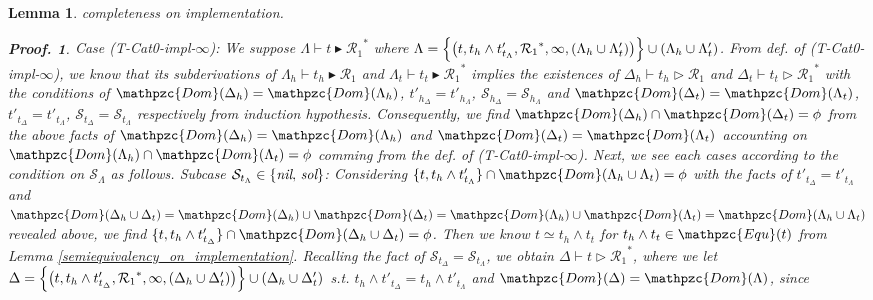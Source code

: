 \documentclass[12pt]{article}
\newtheorem{Lemma}{Lemma}[section]
\newtheorem{Proof}{Proof.}
\begin{document}
\begin{Lemma}{completeness on implementation.}
\begin{Proof}
    Case (T-Cat0-impl-$\infty$): We suppose
    $\Lambda \vdash t \blacktriangleright {\mathcal{R}_1}^*$ where
    $\Lambda = \Bigl\{\bigl(t, t_h \wedge t'_{t_\Lambda},
    {\mathcal{R}_1}^*, \infty, (\Lambda_h \cup \Lambda'_t) \bigr) \Bigr\}
    \cup (\Lambda_h \cup \Lambda'_t)$. From def. of (T-Cat0-impl-$\infty$),
    we know that its subderivations of
    $\Lambda_h \vdash t_h \blacktriangleright \mathcal{R}_1$ and
    $\Lambda_t \vdash t_t \blacktriangleright {\mathcal{R}_1}^*$ implies
    the existences of $\Delta_h \vdash t_h \triangleright \mathcal{R}_1$
    and $\Delta_t \vdash t_t \triangleright {\mathcal{R}_1}^*$ with
    the conditions of
    $\mathpzc{Dom}(\Delta_h) = \mathpzc{Dom}(\Lambda_h)$,
    $t'_{h_\Delta} = t'_{h_\Lambda}$,
    $\mathcal{S}_{h_\Delta} = \mathcal{S}_{h_\Lambda}$ and
    $\mathpzc{Dom}(\Delta_t) = \mathpzc{Dom}(\Lambda_t)$,
    $t'_{t_\Delta} = t'_{t_\Lambda}$,
    $\mathcal{S}_{t_\Delta} = \mathcal{S}_{t_\Lambda}$ respectively
    from induction hypothesis. Consequently, we find
    $\mathpzc{Dom}(\Delta_h) \cap \mathpzc{Dom}(\Delta_t) = \phi$ from
    the above facts of $\mathpzc{Dom}(\Delta_h) = \mathpzc{Dom}(\Lambda_h)$
    and $\mathpzc{Dom}(\Delta_t) = \mathpzc{Dom}(\Lambda_t)$ accounting on
    $\mathpzc{Dom}(\Lambda_h) \cap \mathpzc{Dom}(\Lambda_t) = \phi$ comming
    from the def. of (T-Cat0-impl-$\infty$). Next, we see each cases
    according to the condition on $\mathcal{S}_\Lambda$ as follows.
    Subcase
    $\mathcal{S}_{t_\Lambda} \in \{\text{\it nil},\, \text{\it sol} \}$:
    Considering
    $\{t, t_h \wedge t'_{t_\Lambda} \} \cap \mathpzc{Dom}(\Lambda_h
    \cup \Lambda_t) = \phi$ with the facts of
    $t'_{t_\Delta} = t'_{t_\Lambda}$ and
    $\mathpzc{Dom}(\Delta_h \cup \Delta_t) =
    \mathpzc{Dom}(\Delta_h) \cup \mathpzc{Dom}(\Delta_t) =
    \mathpzc{Dom}(\Lambda_h) \cup \mathpzc{Dom}(\Lambda_t) =
    \mathpzc{Dom}(\Lambda_h \cup \Lambda_t)$ revealed above,
    we find $\{t, t_h \wedge t'_{t_\Delta} \} \cap \mathpzc{Dom}(\Delta_h   
    \cup \Delta_t) = \phi$. Then we know $t \simeq t_h \wedge t_t$ for
    $t_h \wedge t_t \in \mathpzc{Equ}(t)$ from Lemma
    \ref{semiequivalency_on_implementation}. Recalling the fact of
    $\mathcal{S}_{t_\Delta} = \mathcal{S}_{t_\Lambda}$, we obtain
    $\Delta \vdash t \triangleright {\mathcal{R}_1}^*$,
    where we let $\Delta = \Bigl\{\bigl(t, t_h \wedge t'_{t_\Delta},
    {\mathcal{R}_1}^*, \infty, (\Delta_h \cup \Delta'_t) \bigr)\Bigr\}
    \cup (\Delta_h \cup \Delta'_t)$ s.t.
    $t_h \wedge t'_{t_\Delta} = t_h \wedge t'_{t_\Lambda}$ and
    $\mathpzc{Dom}(\Delta) = \mathpzc{Dom}(\Lambda)$, since

\end{Proof}
\end{Lemma}
\end{document}
